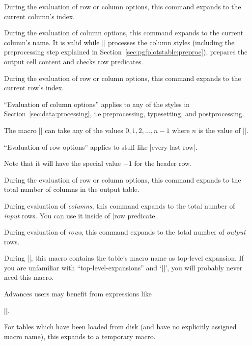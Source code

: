 \documentclass[a4paper]{ltxdoc}
\begin{document}
\begin{command}{\pgfplotstablecol}
    During the evaluation of row or column options, this command expands to the
    current column's index.
\end{command}

\begin{command}{\pgfplotstablecolname}
    During the evaluation of column options, this command expands to the
    current column's name. It is valid while |\pgfplotstabletypeset| processes
    the column styles (including the preprocessing step explained in
    Section~\ref{sec:pgfplotstable:preproc}), prepares the output cell content
    and checks row predicates.
\end{command}

\begin{command}{\pgfplotstablerow}
\label{pgfplotstable:page:tablerow}
    During the evaluation of row or column options, this command expands to the
    current row's index.

    ``Evaluation of column options'' applies to any of the styles in
    Section~\ref{sec:data:processing}, i.e.\@ preprocessing, typesetting, and
    postprocessing.

    The macro |\pgfplotstablerow| can take any of the values $0,1,2,\dotsc,n-1$
    where $n$ is the value of |\pgfplotstablerows|.

    ``Evaluation of row options'' applies to stuff like |every last row|.

    Note that it will have the special value $-1$ for the header row.
\end{command}

\begin{command}{\pgfplotstablecols}
    During the evaluation of row or column options, this command expands to the
    total number of columns in the output table.
\end{command}

\begin{command}{\pgfplotstablerows}
    During evaluation of \emph{columns}, this command expands to the total
    number of \emph{input} rows. You can use it inside of |row predicate|.

    During evaluation of \emph{rows}, this command expands to the total number
    of \emph{output} rows.
\end{command}

\begin{command}{\pgfplotstablename}
    During |\pgfplotstabletypeset|, this macro contains the table's macro name
    as top-level expansion. If you are unfamiliar with ``top-level-expansions''
    and `|\expandafter|', you will probably never need this macro.

    Advances users may benefit from expressions like

    |\expandafter\pgfplotstabletypeset\pgfplotstablename|.

    For tables which have been loaded from disk (and have no explicitly
    assigned macro name), this expands to a temporary macro.
\end{command}
\end{document}
